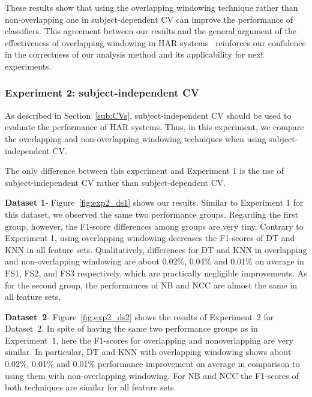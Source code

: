 \documentclass[sensors,article,submit,moreauthors,pdftex]{Definitions/mdpi}
\begin{document}
These results show that using the overlapping windowing technique rather than non-overlapping one in subject-dependent CV can improve the performance of classifiers. This agreement between our results and the general argument of the effectiveness of overlapping windowing in HAR systems~\cite{janidarmian2017comprehensive,janidarmian2014automated}
reinforces our confidence in the correctness of our analysis method and its applicability for next experiments.  



\subsubsection{Experiment 2: subject-independent CV} \label{sec:ex2}
As described in Section~\ref{sub:CVs},  subject-independent CV should be used to evaluate the performance of HAR systems. Thus, in this experiment, we compare the overlapping and non-overlapping windowing techniques when using subject-independent CV.  

The only difference between this experiment and Experiment 1 is the use of subject-independent CV rather than subject-dependent CV.

\noindent\textbf{Dataset 1}- Figure~\ref{fig:exp2_ds1} shows our results. Similar to Experiment 1 for this dataset, we observed the same two performance groups. Regarding the first group, however, the F1-score differences among groups are very tiny. Contrary to Experiment 1, using overlapping windowing decreases the F1-scores of DT and KNN in all feature sets. Qualitatively, differences for DT and KNN in overlapping and non-overlapping windowing are about 0.02\%, 0.04\% and 0.01\% on average in FS1, FS2, and FS3 respectively, which are practically negligible improvements.  
As for the second group, the performances of NB and NCC are almost the same in all feature sets. 

\noindent\textbf{Dataset~2}- Figure~\ref{fig:exp2_ds2} shows the results of Experiment~2 for Dataset~2. In spite of having the same two performance groups as in Experiment~1, here the F1-scores for overlapping and nonoverlapping are very similar.
In particular, DT and KNN with overlapping windowing shows about 0.02\%, 0.01\% and 0.01\% performance improvement on average in comparison to using them with non-overlapping windowing. For NB and NCC the F1-scores of both techniques are similar for all feature sets.
\end{document}
